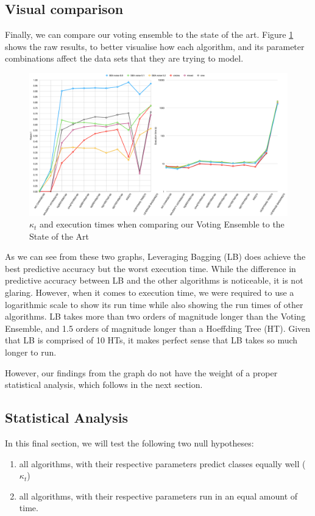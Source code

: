 \subsection{Visual comparison}

Finally, we can compare our voting ensemble to the state of the art. Figure \ref{fig:raw_compare_sota_all} shows the raw results, to better visualise how each algorithm, and its parameter combinations affect the data sets that they are trying to model.

\begin{figure}
  \includegraphics[width=\linewidth]{./images/chapter5/compare_sota_all}
\caption{\label{fig:raw_compare_sota_all}$\kappa_t$ and execution times when comparing our Voting Ensemble to the State of the Art}
\end{figure}

As we can see from these two graphs, Leveraging Bagging (LB) does achieve the best predictive accuracy but the worst execution time. While the difference in predictive accuracy between LB and the other algorithms is noticeable, it is not glaring. However, when it comes to execution time, we were required to use a logarithmic scale to show its run time while also showing the run times of other algorithms. LB takes more than two orders of magnitude longer than the Voting Ensemble, and 1.5 orders of magnitude longer than a Hoeffding Tree (HT). Given that LB is comprised of 10 HTs, it makes perfect sense that LB takes so much longer to run.

However, our findings from the graph do not have the weight of a proper statistical analysis, which follows in the next section.

\subsection{Statistical Analysis}
In this final section, we will test the following two null hypotheses:
\begin{enumerate}
\item all algorithms, with their respective parameters predict classes equally well ($\kappa_t$)
\item all algorithms, with their respective parameters run in an equal amount of time.
\end{enumerate}

